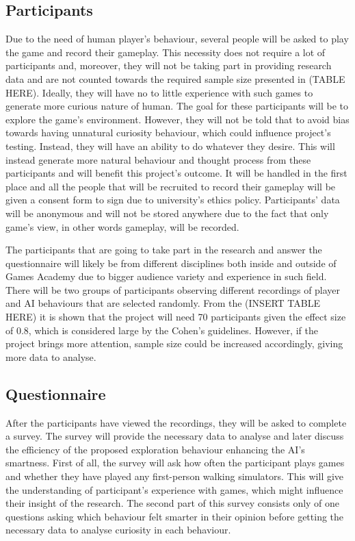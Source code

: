 \documentclass[journal]{IEEEtran}
\begin{document}
\subsection{Participants}
Due to the need of human player's behaviour, several people will be asked to play the game and record their gameplay. This necessity does not require a lot of participants and, moreover, they will not be taking part in providing research data and are not counted towards the required sample size presented in (TABLE HERE). Ideally, they will have no to little experience with such games to generate more curious nature of human. The goal for these participants will be to explore the game's environment. However, they will not be told that to avoid bias towards having unnatural curiosity behaviour, which could influence project's testing. Instead, they will have an ability to do whatever they desire. This will instead generate more natural behaviour and thought process from these participants and will benefit this project's outcome. It will be handled in the first place and all the people that will be recruited to record their gameplay will be given a consent form to sign due to university's ethics policy. Participants' data will be anonymous and will not be stored anywhere due to the fact that only game's view, in other words gameplay, will be recorded.

The participants that are going to take part in the research and answer the questionnaire will likely be from different disciplines both inside and outside of Games Academy due to bigger audience variety and experience in such field. There will be two groups of participants observing different recordings of player and AI behaviours that are selected randomly. From the (INSERT TABLE HERE) it is shown that the project will need 70 participants given the effect size of 0.8, which is considered large by the Cohen's guidelines. However, if the project brings more attention, sample size could be increased accordingly, giving more data to analyse.

\subsection{Questionnaire}
After the participants have viewed the recordings, they will be asked to complete a survey. The survey will provide the necessary data to analyse and later discuss the efficiency of the proposed exploration behaviour enhancing the AI's smartness. First of all, the survey will ask how often the participant plays games and whether they have played any first-person walking simulators. This will give the understanding of participant's experience with games, which might influence their insight of the research. The second part of this survey consists only of one questions asking which behaviour felt smarter in their opinion before getting the necessary data to analyse curiosity in each behaviour.
\end{document}
